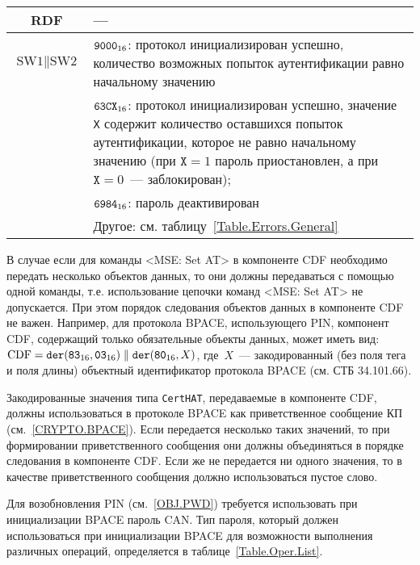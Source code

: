 \begin{table}[h]
\begin{tabular}{|c|p{14cm}|}
\hline 
RDF &  --- \\
\hline
$\text{SW1} \parallel \text{SW2}$ & 
  $\texttt{9000}_{16}$: протокол инициализирован успешно,
количество возможных попыток аутентификации равно начальному значению \\
\cline{2-2}
 & $\texttt{63CX}_{16}$: протокол инициализирован успешно,
значение \texttt{X} содержит количество 
оставшихся попыток аутентификации, которое не равно начальному значению
(при $\texttt{X} = 1$ пароль приостановлен, а при $\texttt{X} = 0$~--- заблокирован);\\
& $\texttt{6984}_{16}$: пароль деактивирован \\
\cline{2-2}
 & Другое: см. таблицу~\ref{Table.Errors.General} \\
\hline
\end{tabular}
\end{table}

В случае если для команды <MSE: Set AT> в компоненте CDF необходимо 
передать несколько объектов данных, то они должны передаваться с помощью 
одной команды, т.е. использование цепочки команд <MSE: Set AT> не 
допускается. При этом порядок следования объектов данных в компоненте CDF 
не важен. Например, для протокола BPACE, использующего PIN, компонент CDF, 
содержащий только обязательные объекты данных, может иметь вид: 
$\text{CDF} = 
\texttt{der}(\texttt{83}_{16}, \texttt{03}_{16}) \parallel 
\texttt{der}(\texttt{80}_{16}, X)$, где~$X$~--- закодированный (без поля тега и 
поля длины) объектный идентификатор протокола BPACE (см. СТБ 34.101.66).

Закодированные значения типа \verb|CertHAT|, передаваемые в компоненте CDF, 
должны использоваться в протоколе BPACE как приветственное сообщение КП
(см.~\ref{CRYPTO.BPACE}).
%
Если передается несколько таких значений, то при формировании приветственного
сообщения они должны объединяться в порядке следования в компоненте CDF. Если же
не передается ни одного значения, то в качестве приветственного сообщения должно
использоваться пустое слово.
 

Для возобновления PIN (см.~\ref{OBJ.PWD}) требуется 
использовать при инициализации BPACE пароль CAN. 
Тип пароля, который должен использоваться при 
инициализации BPACE для возможности выполнения различных 
операций, определяется в таблице~\ref{Table.Oper.List}.

